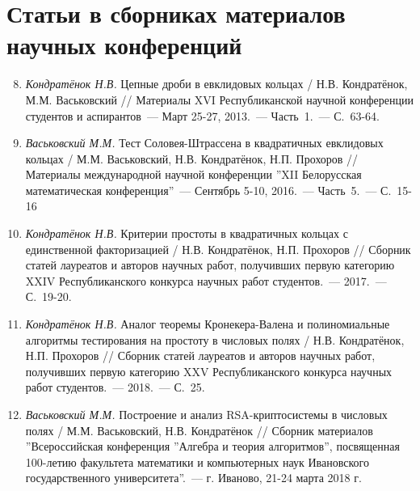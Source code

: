 \vspace{-4ex}
\section*{\fontsize{14}{15}\selectfont Статьи в сборниках материалов научных конференций}
\vspace{-4ex}

\begin{enumerate}
\setcounter{enumi}{7}

    \item \label{source:Republican_Scientific_Conference_of_Students_and_Postgraduates_2013}
    \textit{Кондратёнок Н.В.} Цепные дроби в евклидовых кольцах / Н.В. Кондратёнок, М.М. Васьковский // Материалы XVI Республиканской научной конференции студентов и аспирантов~--- Март 25-27, 2013.~--- Часть~1.~--- С.~63-64.

    \item \label{source:XII_Belarussian_math_conference_2016}
    \textit{Васьковский М.М.} Тест Соловея-Штрассена в квадратичных евклидовых кольцах / М.М. Васьковский, Н.В. Кондратёнок, Н.П. Прохоров // Материалы международной научной конференции ''XII Белорусская математическая конференция''~--- Сентябрь 5-10, 2016.~--- Часть~5.~--- С.~15-16

    \item \label{source:Collection_of_articles_by_laureates_2017}
    \textit{Кондратёнок Н.В.} Критерии простоты в квадратичных кольцах с единственной факторизацией / Н.В. Кондратёнок, Н.П. Прохоров // Сборник статей лауреатов и авторов научных работ, получивших первую категорию XXIV Республиканского конкурса научных работ студентов.~--- 2017.~--- С.~19-20.

    \item \label{source:Collection_of_articles_by_laureates_2018}
    \textit{Кондратёнок Н.В.} Аналог теоремы Кронекера-Валена и полиномиальные алгоритмы тестирования на простоту в числовых полях / Н.В. Кондратёнок, Н.П. Прохоров // Сборник статей лауреатов и авторов научных работ, получивших первую категорию XXV Республиканского конкурса научных работ студентов.~--- 2018.~--- С.~25.

    \item \label{source:Algebra_and_theory_of_algorithms}
    \textit{Васьковский М.М.} Построение и анализ RSA-криптосистемы в числовых полях / М.М. Васьковский, Н.В. Кондратёнок // Сборник материалов ''Всероссийская конференция ''Алгебра и теория алгоритмов'', посвященная 100-летию факультета математики и компьютерных наук Ивановского государственного университета''.~--- г. Иваново, 21-24 марта 2018 г.


\end{enumerate}
